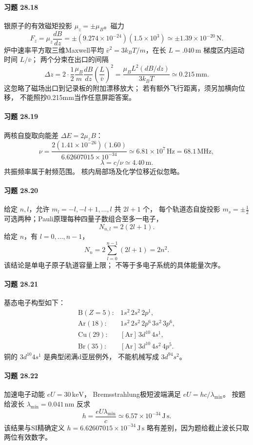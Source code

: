 \paragraph{习题 28.18}
银原子的有效磁矩投影
\(\mu_z=\pm\mu_B\)。磁力
\[
\boxed{F_z=\mu_z\frac{dB}{dz}
=\pm(9.274\times10^{-24})(1.5\times10^3)
\simeq\pm1.39\times10^{-20}\,\mathrm N}.
\]
炉中速率平方取三维Maxwell平均
\(\bar v^2=3k_BT/m\)，在长 \(L=.040\,\mathrm m\)
梯度区内运动时间 \(L/\bar v\)；
两个分束在出口的间隔
\[
\boxed{\Delta z
=2\cdot\frac12\frac{\mu_B}{m}
\frac{dB}{dz}\left(\frac{L}{\bar v}\right)^2
=\frac{\mu_B L^2(dB/dz)}{3k_BT}
\simeq0.215\,\mathrm{mm}}.
\]
这忽略了磁场出口到记录板的附加漂移放大；
若有额外飞行距离，须另加横向位移，
不能照抄0.215mm当作任意屏距答案。

\paragraph{习题 28.19}
两核自旋取向能差
\(\Delta E=2\mu_zB\)：
\[
\boxed{\nu=\frac{2(1.41\times10^{-26})(1.60)}
{6.62607015\times10^{-34}}
\simeq6.81\times10^7\,\mathrm{Hz}=68.1\,\mathrm{MHz}},
\]
\[
\boxed{\lambda=c/\nu\simeq4.40\,\mathrm m}.
\]
共振频率属于射频范围。
核内局部场及化学位移近似忽略。

\paragraph{习题 28.20}
给定 \(n,l\)，允许
\(m_l=-l,-l+1,\ldots,l\) 共 \(2l+1\) 个，
每个轨道态自旋投影 \(m_s=\pm\frac12\)
可选两种；Pauli原理每种四量子数组合至多一电子，
\[
\boxed{N_{n,l}=2(2l+1)}.
\]
给定 \(n\)，有 \(l=0,\ldots,n-1\)，
\[
\boxed{N_n=2\sum_{l=0}^{n-1}(2l+1)=2n^2}.
\]
该结论是单电子原子轨道容量上限；
不等于多电子系统的具体能量次序。

\paragraph{习题 28.21}
基态电子构型如下：
\[
\begin{array}{ll}
\mathrm B(Z=5):&1s^2\,2s^2\,2p^1,\\
\mathrm{Ar}(18):&1s^2\,2s^2\,2p^6\,3s^2\,3p^6,\\
\mathrm{Cu}(29):&[\mathrm{Ar}]\,3d^{10}\,4s^1,\\
\mathrm{Br}(35):&[\mathrm{Ar}]\,3d^{10}\,4s^2\,4p^5.
\end{array}
\]
铜的 \(3d^{10}4s^1\) 是典型闭满d亚层例外，
不能机械写成 \(3d^94s^2\)。

\paragraph{习题 28.22}
加速电子动能 \(eU=30\,\mathrm{keV}\)，
Bremsstrahlung极短波端满足
\(eU=hc/\lambda_{\min}\)。
按题给波长 \(\lambda_{\min}=0.041\,\mathrm{nm}\)
反求
\[
\boxed{h=\frac{eU\lambda_{\min}}c
\simeq6.57\times10^{-34}\,\mathrm{J\,s}}.
\]
该结果与SI精确定义
\(h=6.62607015\times10^{-34}\,\mathrm{J\,s}\)
略有差别，因为题给截止波长只取两位有效数字。

